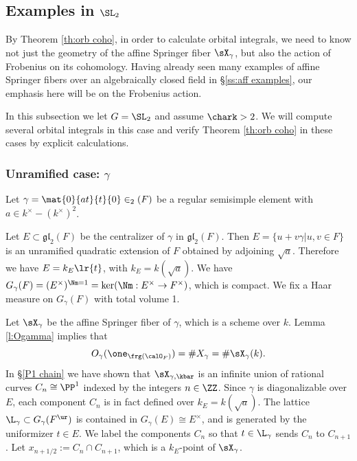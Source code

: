 \subsection{Examples in $\SL_{2}$}
By Theorem \ref{th:orb coho}, in order to calculate orbital integrals, we need to know not just the geometry of the affine Springer fiber $\sX_{\gamma}$, but also the action of Frobenius on its cohomology. Having already seen many examples of affine Springer fibers over an algebraically closed field in \S\ref{ss:aff examples}, our emphasis here will be on the Frobenius action. 

In this subsection we let $G=\SL_{2}$ and assume $\chark>2$. We will compute several orbital integrals in this case and verify Theorem \ref{th:orb coho} in these cases by explicit calculations.

\subsubsection{Unramified case: $\gamma$}\label{unram sl2} Let $\gamma=\mat{0}{at}{t}{0}\in\sl_{2}(F)$ be a regular semisimple element with $a\in k^{\times}-(k^{\times})^{2}$. 

Let $E\subset\mathfrak{gl}_{2}(F)$ be the centralizer of $\gamma$ in $\mathfrak{gl}_{2}(F)$. Then $E=\{u+v\gamma|u,v\in F\}$ is an unramified quadratic extension of $F$ obtained by adjoining $\sqrt{a}$. Therefore we have $E=k_{E}\lr{t}$, with $k_{E}= k(\sqrt{a})$. We have $G_{\gamma}(F)=(E^{\times})^{\Nm=1}=\ker(\Nm: E^{\times}\to F^{\times})$, which is compact. We fix a Haar measure on $G_{\gamma}(F)$ with total volume 1. 

Let $\sX_{\gamma}$ be the affine Springer fiber of $\gamma$, which is a scheme over $k$. Lemma \ref{l:Ogamma} implies that
\begin{equation*}
O_{\gamma}(\one_{\frg(\calO_{F})})=\#X_{\gamma}=\#\sX_{\gamma}(k).
\end{equation*}
In \S\ref{P1 chain} we have shown that $\sX_{\gamma,\kbar}$ is an infinite union of rational curves $C_{n}\cong\PP^{1}$ indexed by the integers $n\in\ZZ$. Since $\gamma$ is diagonalizable over $E$,  each component $C_{n}$ is in fact defined over $k_{E}=k(\sqrt{a})$. The lattice $\L_{\gamma}\subset G_{\gamma}(F^{\ur})$ is contained in $G_{\gamma}(E)\cong E^{\times}$, and is generated by the uniformizer $t\in E$. We label the components $C_{n}$ so that $t\in \L_{\gamma}$ sends $C_{n}$ to $C_{n+1}$. Let $x_{n+1/2}:=C_{n}\cap C_{n+1}$, which is a $k_{E}$-point of $\sX_{\gamma}$.  

